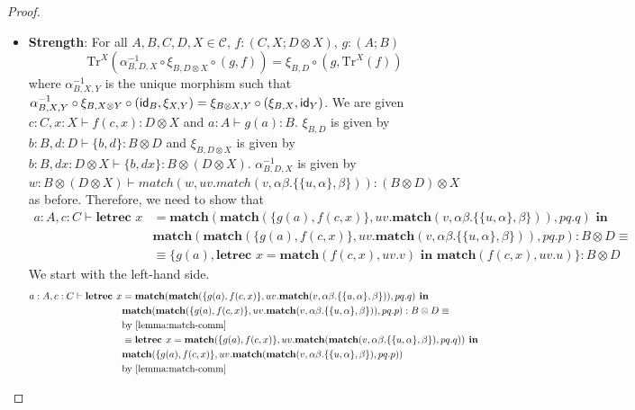 \begin{example}
\begin{proof}
\begin{itemize}
\begin{align*}
\end{align*}
We can see that the left-hand side and the right-hand side are the same, so we are done.
\item \textbf{Strength}:  For all $A,B,C,D,X \in \mathcal{C}$, $f : (C,X;D \otimes X)$, $g : (A;B)$
\[
\text{Tr}^{X}(\alpha_{B,D,X}^{-1} \circ \xi_{B, D \otimes X} \circ (g,f)) = \xi_{B,D} \circ (g, \text{Tr}^{X}(f))
\]
where $\alpha_{B,X,Y}^{-1}$ is the unique morphism such that $\alpha_{B,X,Y}^{-1} \circ \xi_{B,X \otimes Y} \circ (\textsf{id}_{B}, \xi_{X,Y}) = \xi_{B \otimes X, Y} \circ (\xi_{B,X}, \textsf{id}_{Y})$.
We are given $c : C, x : X \vdash f(c,x) : D \otimes X$ and $a : A \vdash g(a) : B$.
$\xi_{B, D}$ is given by $b : B, d : D \vdash \{b, d\} : B \otimes D$ and $\xi_{B, D \otimes X}$ is given by $b : B, dx : D \otimes X \vdash \{b, dx\} : B \otimes (D \otimes X)$.
$\alpha_{B,D,X}^{-1}$ is given by $w : B \otimes (D \otimes X) \vdash  match(w, uv. match(v, \alpha\beta.\{\{u,\alpha\},\beta\})) : (B \otimes D) \otimes X$ as before. 
Therefore, we need to show that
\begin{align*}
a : A, c : C \vdash \textbf{letrec } x &= \textbf{match}(\textbf{match}(\{g(a), f(c,x)\}, uv.\textbf{match}(v, \alpha\beta.\{\{u,\alpha\},\beta\})), pq.q) \textbf{ in }\\
&\textbf{match}(\textbf{match}(\{g(a), f(c,x)\}, uv.\textbf{match}(v, \alpha\beta.\{\{u,\alpha\},\beta\})), pq.p) : B \otimes D \equiv\\
&\equiv \{g(a), \textbf{letrec } x = \textbf{match}(f(c,x), uv.v) \textbf{ in } \textbf{match}(f(c,x), uv.u)\} : B \otimes D
\end{align*}
We start with the left-hand side.
\begin{align*}
a : A, c : C \vdash \textbf{letrec } x &= \textbf{match}(\textbf{match}(\{g(a), f(c,x)\}, uv.\textbf{match}(v, \alpha\beta.\{\{u,\alpha\},\beta\})), pq.q) \textbf{ in }\\
&\textbf{match}(\textbf{match}(\{g(a), f(c,x)\}, uv.\textbf{match}(v, \alpha\beta.\{\{u,\alpha\},\beta\})), pq.p) : B \otimes D \equiv\\
&\text{by \cref{lemma:match-comm}}\\
&\equiv \textbf{letrec } x = \textbf{match}(\{g(a),f(c,x)\}, uv.\textbf{match}(\textbf{match}(v,\alpha\beta.\{\{u,\alpha\}, \beta\}), pq.q)) \textbf{ in }\\
&\textbf{match}(\{g(a),f(c,x)\}, uv.\textbf{match}(\textbf{match}(v,\alpha\beta.\{\{u,\alpha\}, \beta\}), pq.p))\\
&\text{by \cref{lemma:match-comm}}\\

\end{align*}
\end{itemize}
\end{proof}
\end{example}
